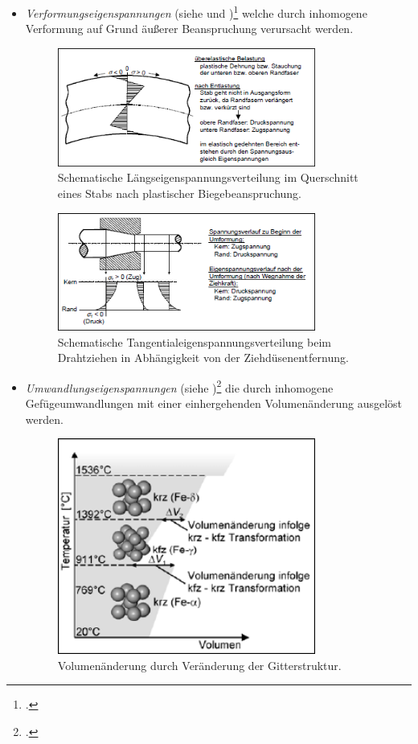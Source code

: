\documentclass[12pt,a4paper,parskip]{scrartcl}
\begin{document}
{\begin{itemize}
\item \emph{Verformungseigenspannungen} (siehe  und )\footcite[34]{hu} welche durch inhomogene Verformung auf Grund äußerer Beanspruchung verursacht werden.\begin{figure}
  \centering
  \includegraphics[width=0.8\textwidth]{eigenspanfaser}
  \caption{Schematische Längseigenspannungsverteilung im Querschnitt eines Stabs nach plastischer Biegebeanspruchung.}
  \label{fig:eigenspanfaser}
  \end{figure}
  \begin{figure}
  \centering
  \includegraphics[width=0.8\textwidth]{eigenspandrahtzieh}
  \caption{Schematische Tangentialeigenspannungsverteilung beim Drahtziehen in Abhängigkeit von der Ziehdüsenentfernung.}
  \label{fig:eigenspandrahtzieh}
  \end{figure}
\item \emph{Umwandlungseigenspannungen} (siehe )\footcite[35]{hu} die durch inhomogene Gefügeumwandlungen  
mit einer einhergehenden Volumenänderung ausgelöst werden.\begin{figure}
  \centering
  \includegraphics[width=0.8\textwidth]{eigenspanmol}
  \caption{Volumenänderung durch Veränderung der Gitterstruktur.}
  \label{fig:eigenspanmol}
  \end{figure}
\end{itemize}

}
\end{document}
